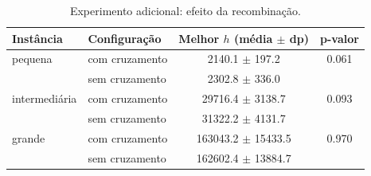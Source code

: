 \begin{table}[H]
\centering
\caption{Experimento adicional: efeito da recombinação.}
\label{tab:experimento-ag}
\begin{tabular}{llcc}
\toprule
Instância & Configuração & Melhor $h$ (média $\pm$ dp) & p-valor \\
\midrule
pequena & com cruzamento & 2140.1 $\pm$ 197.2 & 0.061 \\
 & sem cruzamento & 2302.8 $\pm$ 336.0 &  \\
\midrule
intermedi\'aria & com cruzamento & 29716.4 $\pm$ 3138.7 & 0.093 \\
 & sem cruzamento & 31322.2 $\pm$ 4131.7 &  \\
\midrule
grande & com cruzamento & 163043.2 $\pm$ 15433.5 & 0.970 \\
 & sem cruzamento & 162602.4 $\pm$ 13884.7 &  \\
\bottomrule
\end{tabular}
\end{table}